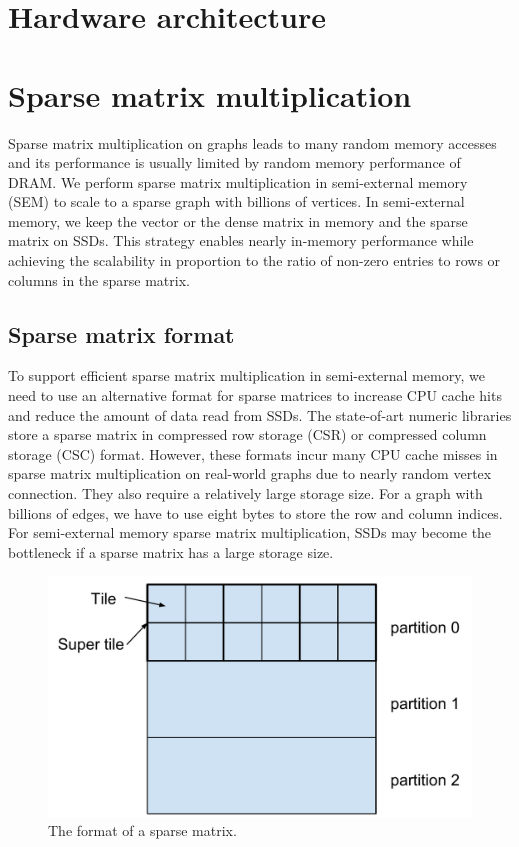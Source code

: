 \section{Hardware architecture}

\section{Sparse matrix multiplication}
Sparse matrix multiplication on graphs leads to many random memory
accesses and its performance is usually limited by random memory performance
of DRAM. We perform sparse matrix multiplication in semi-external memory (SEM)
to scale to a sparse graph with billions of vertices. In semi-external memory,
we keep the vector or the dense matrix in memory and the sparse matrix on SSDs.
This strategy enables nearly in-memory performance while achieving
the scalability in proportion to the ratio of non-zero entries to rows or columns
in the sparse matrix.

\subsection{Sparse matrix format}
To support efficient sparse matrix multiplication in semi-external memory,
we need to use an alternative format for sparse matrices to increase CPU cache
hits and reduce the amount of data read from SSDs.
The state-of-art numeric libraries store a sparse matrix in compressed row storage
(CSR) or compressed column storage (CSC) format. However, these formats incur
many CPU cache misses in sparse matrix multiplication on real-world graphs
due to nearly random vertex connection. They also require a relatively
large storage size. For a graph with billions of edges, we have to use eight
bytes to store the row and column indices. For semi-external memory sparse
matrix multiplication, SSDs may become the bottleneck if a sparse matrix has
a large storage size.

\begin{figure}
\centering
\includegraphics[scale=0.3]{./sparse_mat.pdf}
\caption{The format of a sparse matrix.}
\label{sparse_mat}
\end{figure}

